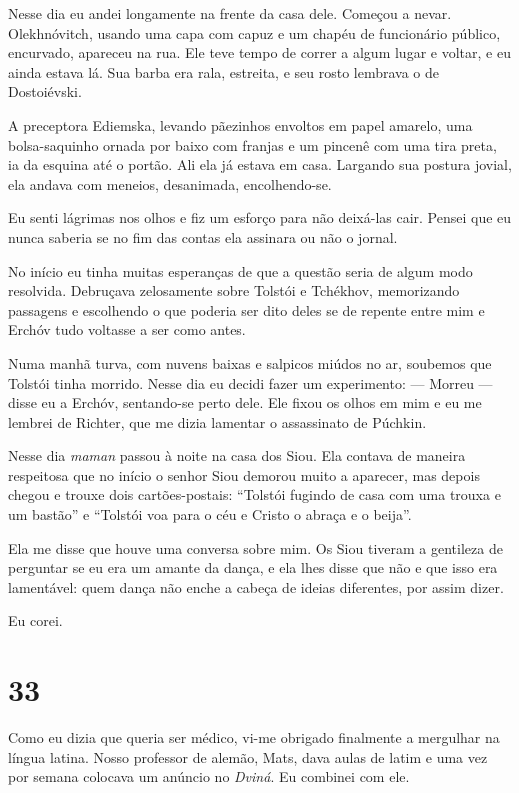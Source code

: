 Nesse dia eu andei longamente na frente da casa dele. Começou a nevar.
Olekhnóvitch, usando uma capa com capuz e um chapéu de funcionário
público, encurvado, apareceu na rua. Ele teve tempo de correr a algum
lugar e voltar, e eu ainda estava lá. Sua barba era rala, estreita, e
seu rosto lembrava o de Dostoiévski.

A preceptora Ediemska, levando pãezinhos envoltos em papel amarelo, uma
bolsa-saquinho ornada por baixo com franjas e um pincenê com uma tira
preta, ia da esquina até o portão. Ali ela já estava em casa. Largando
sua postura jovial, ela andava com meneios, desanimada, encolhendo-se.

Eu senti lágrimas nos olhos e fiz um esforço para não deixá-las cair.
Pensei que eu nunca saberia se no fim das contas ela assinara ou não o
jornal.

No início eu tinha muitas esperanças de que a questão seria de algum
modo resolvida. Debruçava zelosamente sobre Tolstói e Tchékhov,
memorizando passagens e escolhendo o que poderia ser dito deles se de
repente entre mim e Erchóv tudo voltasse a ser como antes.

Numa manhã turva, com nuvens baixas e salpicos miúdos no ar, soubemos
que Tolstói tinha morrido. Nesse dia eu decidi fazer um experimento: ---
Morreu --- disse eu a Erchóv, sentando-se perto dele. Ele fixou os olhos
em mim e eu me lembrei de Richter, que me dizia lamentar o assassinato
de Púchkin.

Nesse dia \emph{maman} passou à noite na casa dos Siou. Ela contava de
maneira respeitosa que no início o senhor Siou demorou muito a aparecer,
mas depois chegou e trouxe dois cartões-postais: ``Tolstói fugindo de
casa com uma trouxa e um bastão'' e ``Tolstói voa para o céu e Cristo o
abraça e o beija''.

Ela me disse que houve uma conversa sobre mim. Os Siou tiveram a
gentileza de perguntar se eu era um amante da dança, e ela lhes disse
que não e que isso era lamentável: quem dança não enche a cabeça de
ideias diferentes, por assim dizer.

Eu corei.

\section{33}

Como eu dizia que queria ser médico, vi-me obrigado finalmente a
mergulhar na língua latina. Nosso professor de alemão, Mats, dava aulas
de latim e uma vez por semana colocava um anúncio no \emph{Dviná}. Eu
combinei com ele.

